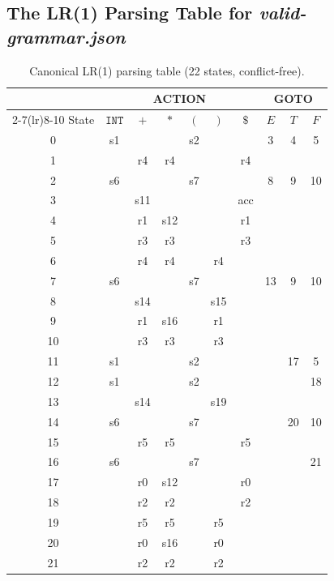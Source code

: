 \documentclass{article}
\newcommand{\tINT}{\mathtt{INT}}
\begin{document}
\subsection{The LR(1) Parsing Table for \textit{valid-grammar.json}}

\begin{table}[H]
\centering
\begin{tabular}{c cccccc ccc}
\toprule
& \multicolumn{6}{c}{ACTION} & \multicolumn{3}{c}{GOTO} \\
\cmidrule(lr){2-7}\cmidrule(lr){8-10}
State & $\tINT$ & $+$ & $*$ & $($ & $)$ & $\$$ & $E$ & $T$ & $F$ \\
\midrule
0 & s1 &  &  & s2 &  &  & 3 & 4 & 5 \\
1 &  & r4 & r4 &  &  & r4 &  &  &  \\
2 & s6 &  &  & s7 &  &  & 8 & 9 & 10 \\
3 &  & s11 &  &  &  & acc &  &  &  \\
4 &  & r1 & s12 &  &  & r1 &  &  &  \\
5 &  & r3 & r3 &  &  & r3 &  &  &  \\
6 &  & r4 & r4 &  & r4 &  &  &  &  \\
7 & s6 &  &  & s7 &  &  & 13 & 9 & 10 \\
8 &  & s14 &  &  & s15 &  &  &  &  \\
9 &  & r1 & s16 &  & r1 &  &  &  &  \\
10 &  & r3 & r3 &  & r3 &  &  &  &  \\
11 & s1 &  &  & s2 &  &  &  & 17 & 5 \\
12 & s1 &  &  & s2 &  &  &  &  & 18 \\
13 &  & s14 &  &  & s19 &  &  &  &  \\
14 & s6 &  &  & s7 &  &  &  & 20 & 10 \\
15 &  & r5 & r5 &  &  & r5 &  &  &  \\
16 & s6 &  &  & s7 &  &  &  &  & 21 \\
17 &  & r0 & s12 &  &  & r0 &  &  &  \\
18 &  & r2 & r2 &  &  & r2 &  &  &  \\
19 &  & r5 & r5 &  & r5 &  &  &  &  \\
20 &  & r0 & s16 &  & r0 &  &  &  &  \\
21 &  & r2 & r2 &  & r2 &  &  &  &  \\
\bottomrule
\end{tabular}
\caption{Canonical LR(1) parsing table (22 states, conflict-free).}
\label{tab:lr1}
\end{table}
\end{document}
